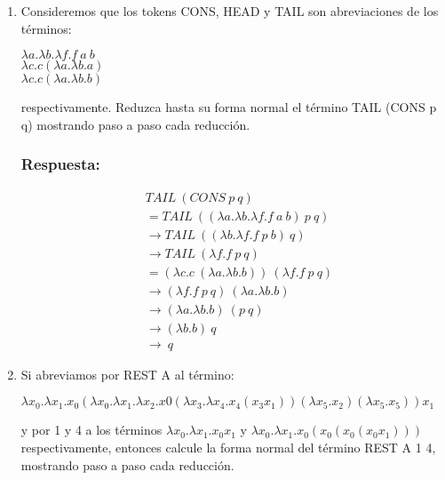 \documentclass{article}
\begin{document}
\begin{enumerate}

\item Consideremos que los tokens CONS, HEAD y TAIL son abreviaciones de los términos:

\begin{center}

$\lambda a . \lambda b . \lambda f . f\  a\  b$
\\$\lambda c . c (\lambda a . \lambda b . a)$
\\$\lambda c . c (\lambda a . \lambda b . b)$

\end{center}

respectivamente. Reduzca hasta su forma normal el término TAIL (CONS p q) mostrando paso a paso cada reducción.

\subsubsection*{Respuesta:}

\begin{align*}
&TAIL\ ( CONS\ p\ q )
\\&= TAIL\ ((\lambda a . \lambda b . \lambda f . f \  a \  b) \  p \  q)
\\&\rightarrow TAIL\  ((\lambda b . \lambda f . f \  p \  b)\  q)
\\&\rightarrow TAIL\  (\lambda f . f\ p\ q)
\\&= (\lambda c.c\ (\lambda a . \lambda b . b))\ (\lambda f . f\ p\ q)
\\&\rightarrow (\lambda f.f\ p\ q)\ (\lambda a.\lambda b.b)
\\&\rightarrow (\lambda a. \lambda b.b)\ (p\ q)
\\&\rightarrow (\lambda b.b)\ q
\\&\rightarrow \ q
\end{align*}


\item Si abreviamos por REST A al término:

\begin{center}
$
\lambda x_0 .\lambda x_1 . x_0 (\lambda x_0 .\lambda x_1 .\lambda x_2 . x0 (\lambda x_3 .\lambda x_4 . x_4 ( x_3 x_1 ))(\lambda x_5 . x_2 )(\lambda x_5 . x_5 )) x_1
$
\end{center}

y por 1 y 4 a los términos $ \lambda x_0 .\lambda x_1 . x_0 x_1 $ y $ \lambda x_0 . \lambda x_1 . x_0 ( x_0 ( x_0 ( x_0 x_1 ))) $ respectivamente, entonces calcule la forma normal del término REST A 1 4, mostrando paso a paso cada reducción.



\end{enumerate}
\end{document}
